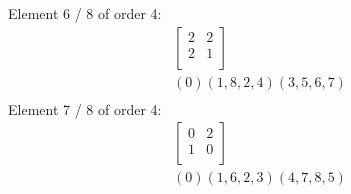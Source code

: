 Element     6 / 8 of order 4:
$$
\begin{array}{c}
\left[
\begin{array}{*{2}{r}}
2 & 2\\
2 & 1\\
\end{array}
\right]
\\
(0)(1, 8, 2, 4)(3, 5, 6, 7)\\
\end{array}
$$
Element     7 / 8 of order 4:
$$
\begin{array}{c}
\left[
\begin{array}{*{2}{r}}
0 & 2\\
1 & 0\\
\end{array}
\right]
\\
(0)(1, 6, 2, 3)(4, 7, 8, 5)\\
\end{array}
$$
